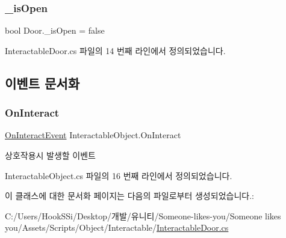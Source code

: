 \subsubsection{\texorpdfstring{\_isOpen}{\_isOpen}}
{\footnotesize\ttfamily bool Door.\+\_\+is\+Open = false\hspace{0.3cm}{\ttfamily [private]}}



Interactable\+Door.\+cs 파일의 14 번째 라인에서 정의되었습니다.



\subsection{이벤트 문서화}
\mbox{\label{class_interactable_object_afe5e0b16d86c2ed4abf4a71a1995f7ae}} 
\subsubsection{\texorpdfstring{OnInteract}{OnInteract}}
{\footnotesize\ttfamily \mbox{\hyperlink{class_interactable_object_a70a579e4b09d53e6cb77b5222189d5eb}{On\+Interact\+Event}} Interactable\+Object.\+On\+Interact\hspace{0.3cm}{\ttfamily [inherited]}}



상호작용시 발생할 이벤트 



Interactable\+Object.\+cs 파일의 16 번째 라인에서 정의되었습니다.



이 클래스에 대한 문서화 페이지는 다음의 파일로부터 생성되었습니다.\+:\begin{DoxyCompactItemize}
\item 
C\+:/\+Users/\+Hook\+S\+Si/\+Desktop/개발/유니티/\+Someone-\/likes-\/you/\+Someone likes you/\+Assets/\+Scripts/\+Object/\+Interactable/\mbox{\hyperlink{_interactable_door_8cs}{Interactable\+Door.\+cs}}\end{DoxyCompactItemize}
